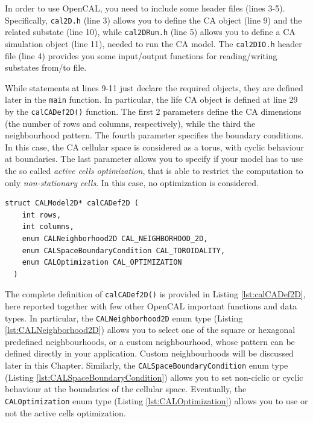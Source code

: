 

In order to use OpenCAL, you need to include some header files (lines
3-5). Specifically, \verb'cal2D.h' (line 3) allows you to define the
CA object (line 9) and the related substate (line 10), while
\verb'cal2DRun.h' (line 5) allows you to define a CA simulation object
(line 11), needed to run the CA model. The \verb'cal2DIO.h' header
file (line 4) provides you some input/output functions for
reading/writing substates from/to file.

While statements at lines 9-11 just declare the required objects, they are
defined later in the \verb'main' function. In particular, the life CA
object is defined at line 29 by the \verb'calCADef2D()' function. The
first 2 parameters define the CA dimensions (the number of rows and
columns, respectively), while the third the neighbourhood pattern. The
fourth parameter specifies the boundary conditions. In this case, the CA
cellular space is considered as a torus, with cyclic behaviour at
boundaries. The last parameter allows you to specify if your model
has to use the so called \emph{active cells optimization}, that is
able to restrict the computation to only \emph{non-stationary cells}. In this
case, no optimization is considered.

\begin{lstlisting}[float,floatplacement=H, label=lst:calCADef2D, caption=Definition of the calCADef2D() function., numbers=none]
  struct CALModel2D* calCADef2D (
    int rows,
    int columns,
    enum CALNeighborhood2D CAL_NEIGHBORHOOD_2D,
    enum CALSpaceBoundaryCondition CAL_TOROIDALITY,
    enum CALOptimization CAL_OPTIMIZATION
  )
\end{lstlisting}  

The complete definition of \verb'calCADef2D()' is provided in Listing
\ref{lst:calCADef2D}, here reported together with few other OpenCAL
important functions and data types. In particular, the
\verb'CALNeighborhood2D' enum type (Listing
\ref{lst:CALNeighborhood2D}) allows you to select one of the square or
hexagonal predefined neighbourhoods, or a custom neighbourhood, whose
pattern can be defined directly in your application. Custom
neighbourhoods will be discussed later in this Chapter. Similarly, the
\verb'CALSpaceBoundaryCondition' enum type (Listing
\ref{lst:CALSpaceBoundaryCondition}) allows you to set non-ciclic or
cyclic behaviour at the boundaries of the cellular space. Eventually,
the \verb'CALOptimization' enum type (Listing
\ref{lst:CALOptimization}) allows you to use or not the active cells
optimization.

